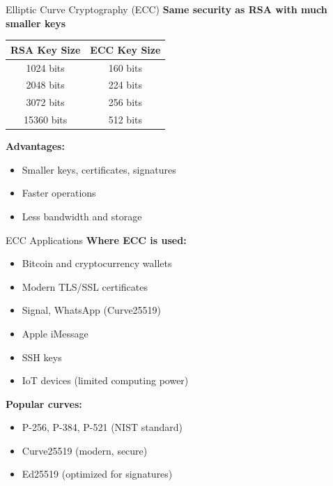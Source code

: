 \documentclass{beamer}
\begin{document}
\begin{frame}{Elliptic Curve Cryptography (ECC)}
\textbf{Same security as RSA with much smaller keys}

\vspace{0.3cm}
\begin{center}
\begin{tabular}{|c|c|}
\hline
\textbf{RSA Key Size} & \textbf{ECC Key Size} \\
\hline
1024 bits & 160 bits \\
2048 bits & 224 bits \\
3072 bits & 256 bits \\
15360 bits & 512 bits \\
\hline
\end{tabular}
\end{center}

\vspace{0.3cm}
\textbf{Advantages:}
\begin{itemize}
    \item Smaller keys, certificates, signatures
    \item Faster operations
    \item Less bandwidth and storage
\end{itemize}

\end{frame}

\begin{frame}{ECC Applications}
\textbf{Where ECC is used:}
\begin{itemize}
    \item Bitcoin and cryptocurrency wallets
    \item Modern TLS/SSL certificates
    \item Signal, WhatsApp (Curve25519)
    \item Apple iMessage
    \item SSH keys
    \item IoT devices (limited computing power)
\end{itemize}

\vspace{0.3cm}
\textbf{Popular curves:}
\begin{itemize}
    \item P-256, P-384, P-521 (NIST standard)
    \item Curve25519 (modern, secure)
    \item Ed25519 (optimized for signatures)
\end{itemize}
\end{frame}
\end{document}
